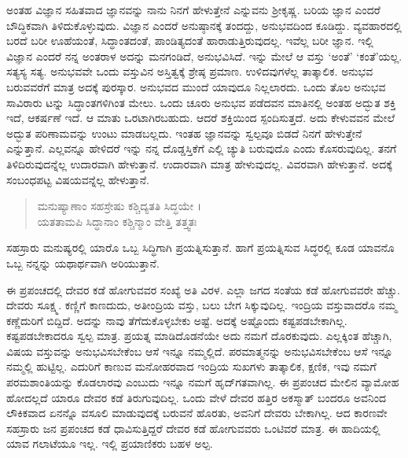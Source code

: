 ಅಂತಹ ವಿಜ್ಞಾನ ಸಹಿತವಾದ ಜ್ಞಾನವನ್ನು ನಾನು ನಿನಗೆ ಹೇಳುತ್ತೇನೆ ಎನ್ನುವನು ಶ್ರೀಕೃಷ್ಣ. ಬರಿಯ ಜ್ಞಾನ ಎಂದರೆ ಬೌದ್ಧಿಕವಾಗಿ ತಿಳಿದುಕೊಳ್ಳುವುದು. ವಿಜ್ಞಾನ ಎಂದರೆ ಅನುಷ್ಠಾನಕ್ಕೆ ತಂದದ್ದು, ಅನುಭವದಿಂದ ಕೂಡಿದ್ದು. ವ್ಯವಹಾರದಲ್ಲಿ ಬರದೆ ಬರೀ ಊಹೆಯಂತೆ, ಸಿದ್ಧಾಂತದಂತೆ, ಪಾಂಡಿತ್ಯದಂತೆ ಹಾರಾಡುತ್ತಿರುವುದಲ್ಲ. ಇವೆಲ್ಲ ಬರೀ ಜ್ಞಾನ. ಇಲ್ಲಿ ವಿಜ್ಞಾನ ಎಂದರೆ ನನ್ನ ಅಂತರಾಳ ಅದನ್ನು ಮನಗಂಡಿದೆ, ಅನುಭವಿಸಿದೆ. ಇನ್ನು ಮೇಲೆ ಆ ವಸ್ತು ‘ಅಂತೆ’ ‘ಕಂತೆ’ಯಲ್ಲ. ಸತ್ಯಸ್ಯ ಸತ್ಯ. ಅನುಭವವೇ ಒಂದು ವಸ್ತುವಿನ ಅಸ್ತಿತ್ವಕ್ಕೆ ಶ್ರೇಷ್ಠ ಪ್ರಮಾಣ. ಉಳಿದವುಗಳೆಲ್ಲ ತಾತ್ಕಾಲಿಕ. ಅನುಭವ ಬರುವವರೆಗೆ ಮಾತ್ರ ಅದಕ್ಕೆ ಪುರಸ್ಕಾರ. ಅನುಭವದ ಮುಂದೆ ಯಾವುದೂ ನಿಲ್ಲಲಾರದು. ಒಂದು ತೊಲ ಅನುಭವ ಸಾವಿರಾರು ಟನ್ನು ಸಿದ್ಧಾಂತಗಳಿಗಿಂತ ಮೇಲು. ಒಂದು ಚೂರು ಅನುಭವ ಪಡೆದವನ ಮಾತಿನಲ್ಲಿ ಅಂತಹ ಅದ್ಭುತ ಶಕ್ತಿ ಇದೆ, ಆಕರ್ಷಣೆ ಇದೆ. ಆ ಮಾತು ಒರಟಾಗಿರಬಹುದು. ಆದರೆ ಶಕ್ತಿಯಿಂದ ಸ್ಪಂದಿಸುತ್ತದೆ. ಅದು ಕೇಳುವವನ ಮೇಲೆ ಅದ್ಭುತ ಪರಿಣಾಮವನ್ನು ಉಂಟು ಮಾಡಬಲ್ಲದು. ಇಂತಹ ಜ್ಞಾನವನ್ನು ಸ್ವಲ್ಪವೂ ಬಿಡದೆ ನಿನಗೆ ಹೇಳುತ್ತೇನೆ ಎನ್ನುತ್ತಾನೆ. ಎಲ್ಲವನ್ನೂ ಹೇಳಿದರೆ ಇನ್ನು ನನ್ನ ದೊಡ್ಡಸ್ತಿಕೆಗೆ ಎಲ್ಲಿ ಚ್ಯುತಿ ಬರುವುದೊ ಎಂದು ಕೊಸರುವುದಿಲ್ಲ. ತನಗೆ ತಿಳಿದಿರುವುದನ್ನೆಲ್ಲ ಉದಾರವಾಗಿ ಹೇಳುತ್ತಾನೆ. ಉದಾರವಾಗಿ ಮಾತ್ರ ಹೇಳುವುದಲ್ಲ. ವಿವರವಾಗಿ ಹೇಳುತ್ತಾನೆ. ಅದಕ್ಕೆ ಸಂಬಂಧಪಟ್ಟ ವಿಷಯವನ್ನೆಲ್ಲ ಹೇಳುತ್ತಾನೆ.

\begin{verse}
ಮನುಷ್ಯಾಣಾಂ ಸಹಸ್ರೇಷು ಕಶ್ಚಿದ್ಯತತಿ ಸಿದ್ಧಯೇ ।\\ಯತತಾಮಪಿ ಸಿದ್ಧಾನಾಂ ಕಶ್ಚಿನ್ಮಾಂ ವೇತ್ತಿ ತತ್ತ್ವತಃ 
\end{verse}

{\small ಸಹಸ್ರಾರು ಮನುಷ್ಯರಲ್ಲಿ ಯಾರೊ ಒಬ್ಬ ಸಿದ್ಧಿಗಾಗಿ ಪ್ರಯತ್ನಿಸುತ್ತಾನೆ. ಹಾಗೆ ಪ್ರಯತ್ನಿಸುವ ಸಿದ್ಧರಲ್ಲಿ ಕೂಡ ಯಾವನೊ ಒಬ್ಬ ನನ್ನನ್ನು ಯಥಾರ್ಥವಾಗಿ ಅರಿಯುತ್ತಾನೆ.}

ಈ ಪ್ರಪಂಚದಲ್ಲಿ ದೇವರ ಕಡೆ ಹೋಗುವವರ ಸಂಖ್ಯೆ ಅತಿ ವಿರಳ. ಎಲ್ಲಾ ಜಗದ ಸಂತೆಯ ಕಡೆ ಹೋಗುವವರೇ ಹೆಚ್ಚು. ದೇವರು ಸೂಕ್ಷ್ಮ. ಕಣ್ಣಿಗೆ ಕಾಣದುದು, ಅತೀಂದ್ರಿಯ ವಸ್ತು, ಬಲು ಬೇಗ ಸಿಕ್ಕುವುದಿಲ್ಲ. ಇಂದ್ರಿಯ ವಸ್ತುವಾದರೊ ನಮ್ಮ ಕಣ್ಣೆದುರಿಗೆ ಬಿದ್ದಿದೆ. ಅದನ್ನು ನಾವು ತೆಗೆದುಕೊಳ್ಳಬೇಕು ಅಷ್ಟೆ. ಅದಕ್ಕೆ ಅಷ್ಟೊಂದು ಕಷ್ಟಪಡಬೇಕಾಗಿಲ್ಲ. ಕಷ್ಟಪಡಬೇಕಾದರೂ ಸ್ವಲ್ಪ ಮಾತ್ರ. ಪ್ರಯತ್ನ ಮಾಡಿದೊಡನೆಯೇ ಅದು ನಮಗೆ ದೊರಕುವುದು. ಎಲ್ಲಕ್ಕಿಂತ ಹೆಚ್ಚಾಗಿ, ವಿಷಯ ವಸ್ತುವನ್ನು ಅನುಭವಿಸಬೇಕೆಂಬ ಆಸೆ ಇನ್ನೂ ನಮ್ಮಲ್ಲಿದೆ. ಪರಮಾತ್ಮನನ್ನು ಅನುಭವಿಸಬೇಕೆಂಬ ಆಸೆ ಇನ್ನೂ ನಮ್ಮಲ್ಲಿ ಹುಟ್ಟಿಲ್ಲ. ಎದುರಿಗೆ ಕಾಣುವ ಮನೋಹರವಾದ ಇಂದ್ರಿಯ ಸುಖಗಳು ತಾತ್ಕಾಲಿಕ, ಕ್ಷಣಿಕ, ಇವು ನಮಗೆ ಪರಮಶಾಂತಿಯನ್ನು ಕೊಡಲಾರವು ಎಂಬುದು ಇನ್ನೂ ನಮಗೆ ಹೃದ್​ಗತವಾಗಿಲ್ಲ. ಈ ಪ್ರಪಂಚದ ಮೇಲಿನ ವ್ಯಾಮೋಹ ಹೋದಲ್ಲದೆ ಯಾರೂ ದೇವರ ಕಡೆ ತಿರುಗುವುದಿಲ್ಲ. ಒಂದು ವೇಳೆ ದೇವರ ಹತ್ತಿರ ಅಕಸ್ಮಾತ್ ಬಂದರೂ ಅವನಿಂದ ಲೌಕಿಕವಾದ ಏನನ್ನೊ ವಸೂಲಿ ಮಾಡುವುದಕ್ಕೆ ಬರುವನೆ ಹೊರತು, ಅವನಿಗೆ ದೇವರು ಬೇಕಾಗಿಲ್ಲ. ಆದ ಕಾರಣವೇ ಸಹಸ್ರಾರು ಜನ ಪ್ರಪಂಚದ ಕಡೆ ಧಾವಿಸುತ್ತಿದ್ದರೆ ದೇವರ ಕಡೆ ಹೋಗುವವರು ಒಂಟಿವರೆ ಮಾತ್ರ. ಈ ಹಾದಿಯಲ್ಲಿ ಯಾವ ಗಲಾಟೆಯೂ ಇಲ್ಲ. ಇಲ್ಲಿ ಪ್ರಯಾಣಿಕರು ಬಹಳ ಅಲ್ಪ.

